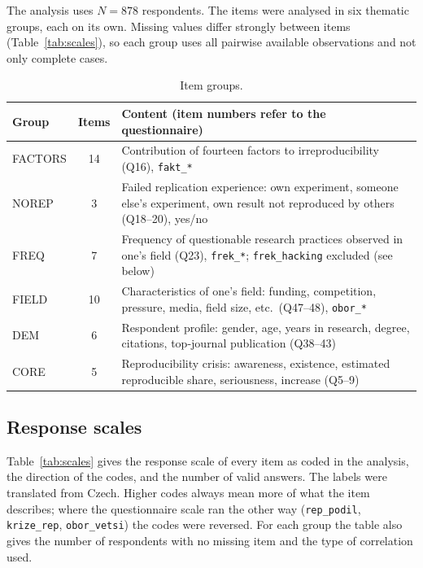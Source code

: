 \documentclass[11pt,a4paper]{article}
\newcommand{\var}[1]{\texttt{#1}}
\begin{document}
The analysis uses $N=878$ respondents. The items were analysed in six thematic groups, each on its own. Missing values differ strongly between items (Table~\ref{tab:scales}), so each group uses all pairwise available observations and not only complete cases.

\begin{table}[ht]
\centering
\small
\begin{tabular}{@{}l c L{9.2cm}@{}}
\toprule
Group & Items & Content (item numbers refer to the questionnaire)\\
\midrule
FACTORS & 14 & Contribution of fourteen factors to irreproducibility (Q16), \var{fakt\_*}\\
NOREP & 3 & Failed replication experience: own experiment, someone else's experiment, own result not reproduced by others (Q18--20), yes/no\\
FREQ & 7 & Frequency of questionable research practices observed in one's field (Q23), \var{frek\_*}; \var{frek\_hacking} excluded (see below)\\
FIELD & 10 & Characteristics of one's field: funding, competition, pressure, media, field size, etc.\ (Q47--48), \var{obor\_*}\\
DEM & 6 & Respondent profile: gender, age, years in research, degree, citations, top-journal publication (Q38--43)\\
CORE & 5 & Reproducibility crisis: awareness, existence, estimated reproducible share, seriousness, increase (Q5--9)\\
\bottomrule
\end{tabular}
\caption{Item groups.}
\label{tab:groups}
\end{table}

\subsection{Response scales}

Table~\ref{tab:scales} gives the response scale of every item as coded in the analysis, the direction of the codes, and the number of valid answers. The labels were translated from Czech. Higher codes always mean more of what the item describes; where the questionnaire scale ran the other way (\var{rep\_podil}, \var{krize\_rep}, \var{obor\_vetsi}) the codes were reversed. For each group the table also gives the number of respondents with no missing item and the type of correlation used.
\end{document}
